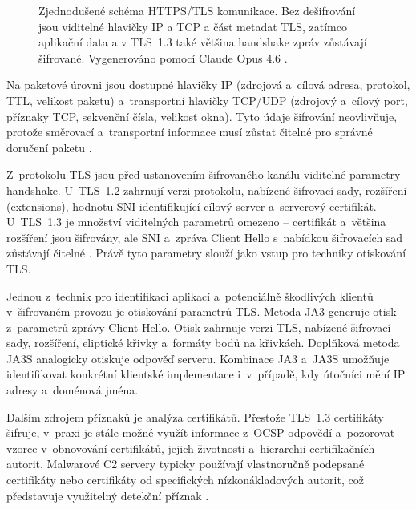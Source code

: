 \begin{figure}[htbp]
\caption[HTTPS paket: viditelné hlavičky a šifrovaný obsah]{Zjednodušené schéma HTTPS/TLS komunikace. Bez dešifrování jsou viditelné hlavičky IP a TCP a část metadat TLS, zatímco aplikační data a v TLS~1.3 také většina handshake zpráv zůstávají šifrované. Vygenerováno pomocí Claude Opus 4.6 \parencite{Anthropic2025}.}
\label{fig:packet-structure}
\end{figure}

Na paketové úrovni jsou dostupné hlavičky IP (zdrojová a~cílová adresa, protokol, TTL, velikost paketu) a~transportní hlavičky TCP/UDP (zdrojový a~cílový port, příznaky TCP, sekvenční čísla, velikost okna). Tyto údaje šifrování neovlivňuje, protože směrovací a~transportní informace musí zůstat čitelné pro správné doručení paketu \parencite{Ji2024}.

Z~protokolu TLS jsou před ustanovením šifrovaného kanálu viditelné parametry handshake. U~TLS~1.2 zahrnují verzi protokolu, nabízené šifrovací sady, rozšíření (extensions), hodnotu SNI identifikující cílový server a~serverový certifikát. U~TLS~1.3 je množství viditelných parametrů omezeno -- certifikát a~většina rozšíření jsou šifrovány, ale SNI a~zpráva Client Hello s~nabídkou šifrovacích sad zůstávají čitelné \parencite{Keshkeh2021}. Právě tyto parametry slouží jako vstup pro techniky otiskování TLS.

Jednou z~technik pro identifikaci aplikací a~potenciálně škodlivých klientů v~šifrovaném provozu je otiskování parametrů TLS. Metoda JA3 \parencite{Althouse2017} generuje otisk z~parametrů zprávy Client Hello. Otisk zahrnuje verzi TLS, nabízené šifrovací sady, rozšíření, eliptické křivky a~formáty bodů na křivkách. Doplňková metoda JA3S analogicky otiskuje odpověď serveru. Kombinace JA3 a~JA3S umožňuje identifikovat konkrétní klientské implementace i~v~případě, kdy útočníci mění IP adresy a~doménová jména.

Dalším zdrojem příznaků je analýza certifikátů. Přestože TLS~1.3 certifikáty šifruje, v~praxi je stále možné využít informace z~OCSP odpovědí a~pozorovat vzorce v~obnovování certifikátů, jejich životnosti a~hierarchii certifikačních autorit. Malwarové C2 servery typicky používají vlastnoručně podepsané certifikáty nebo certifikáty od specifických nízkonákladových autorit, což představuje využitelný detekční příznak \parencite{Keshkeh2021}.


